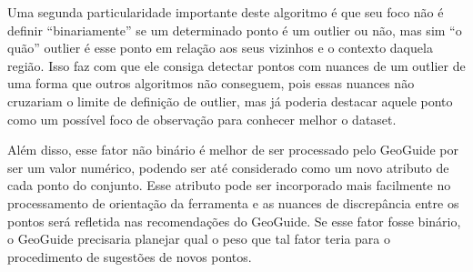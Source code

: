 Uma segunda particularidade importante deste algoritmo é que seu foco não é definir ``binariamente'' se um determinado ponto é um outlier ou não, mas sim ``o quão'' outlier é esse ponto em relação aos seus vizinhos e o contexto daquela região. Isso faz com que ele consiga detectar pontos com nuances de um outlier de uma forma que outros algoritmos não conseguem, pois essas nuances não cruzariam o limite de definição de outlier, mas já poderia destacar aquele ponto como um possível foco de observação para conhecer melhor o dataset.

Além disso, esse fator não binário é melhor de ser processado pelo GeoGuide por ser um valor numérico, podendo ser até considerado como um novo atributo de cada ponto do conjunto. Esse atributo pode ser incorporado mais facilmente no processamento de orientação da ferramenta e as nuances de discrepância entre os pontos será refletida nas recomendações do GeoGuide. Se esse fator fosse binário, o GeoGuide precisaria planejar qual o peso que tal fator teria para o procedimento de sugestões de novos pontos.